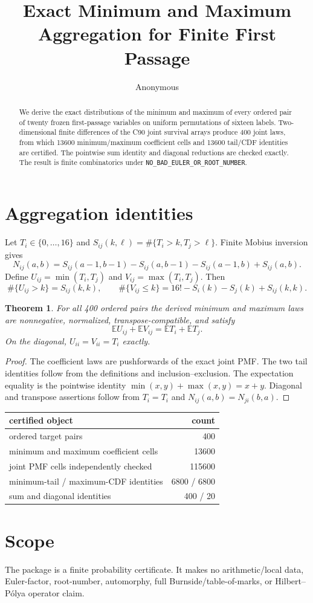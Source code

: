 \documentclass[10pt]{article}
\title{Exact Minimum and Maximum Aggregation for Finite First Passage}
\author{Anonymous}
\date{}
\newtheorem{theorem}{Theorem}
\begin{document}
\maketitle
\begin{abstract}
We derive the exact distributions of the minimum and maximum of every ordered
pair of twenty frozen first-passage variables on uniform permutations of
sixteen labels. Two-dimensional finite differences of the C90 joint survival
arrays produce 400 joint laws, from which 13600 minimum/maximum coefficient
cells and 13600 tail/CDF identities are certified. The pointwise sum identity
and diagonal reductions are checked exactly. The result is finite
combinatorics under \texttt{NO\_BAD\_EULER\_OR\_ROOT\_NUMBER}.
\end{abstract}
\section{Aggregation identities}
Let $T_i\in\{0,\ldots,16\}$ and
$S_{ij}(k,\ell)=\#\{T_i>k,T_j>\ell\}$. Finite Mobius inversion gives
\[
N_{ij}(a,b)=S_{ij}(a-1,b-1)-S_{ij}(a,b-1)-S_{ij}(a-1,b)+S_{ij}(a,b).
\]
Define $U_{ij}=\min(T_i,T_j)$ and $V_{ij}=\max(T_i,T_j)$. Then
\[
\#\{U_{ij}>k\}=S_{ij}(k,k),\qquad
\#\{V_{ij}\le k\}=16!-S_i(k)-S_j(k)+S_{ij}(k,k).
\]
\begin{theorem}
For all 400 ordered pairs the derived minimum and maximum laws are
nonnegative, normalized, transpose-compatible, and satisfy
\[
\mathbb E U_{ij}+\mathbb E V_{ij}=\mathbb E T_i+\mathbb E T_j.
\]
On the diagonal, $U_{ii}=V_{ii}=T_i$ exactly.
\end{theorem}
\begin{proof}
The coefficient laws are pushforwards of the exact joint PMF. The two tail
identities follow from the definitions and inclusion--exclusion. The
expectation equality is the pointwise identity
$\min(x,y)+\max(x,y)=x+y$. Diagonal and transpose assertions follow from
$T_i=T_i$ and $N_{ij}(a,b)=N_{ji}(b,a)$.
\end{proof}
\begin{center}
\begin{tabular}{lr}
\toprule
certified object & count\\
\midrule
ordered target pairs & 400\\
minimum and maximum coefficient cells & 13600\\
joint PMF cells independently checked & 115600\\
minimum-tail / maximum-CDF identities & 6800 / 6800\\
sum and diagonal identities & 400 / 20\\
\bottomrule
\end{tabular}
\end{center}
\section{Scope}
The package is a finite probability certificate. It makes no arithmetic/local
data, Euler-factor, root-number, automorphy, full Burnside/table-of-marks, or
Hilbert--Pólya operator claim.
\end{document}
